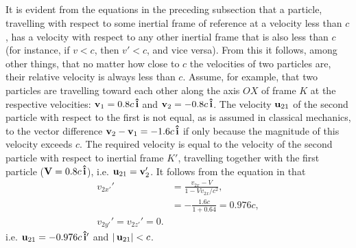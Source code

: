 \subsection{}\label{5.5.3} It is evident from the equations in the preceding subsection that a particle, travelling with respect to some inertial frame of reference at a velocity less than $c$, has a velocity with respect to any other inertial frame that is also less than $c$ (for instance, if $v < c$, then $v' < c$, and vice versa). From this it follows, among other things, that no matter how close to $c$ the velocities of two particles are, their relative velocity is always less than $c$. Assume, for example, that two particles are travelling toward each other along the axis $OX$ of frame $K$ at the respective velocities: $\vb{v}_{1}= 0.8c\,\vu{i}$ and $\vb{v}_{2}= -0.8c\,\vu{i}$. The velocity $\vb{u}_{21}$ of the second particle with respect to the first is not equal, as is assumed in classical mechanics, to the vector difference $\vb{v}_{2} - \vb{v}_{1} = -1.6c\,\vu{i}$ if only because the magnitude of this velocity exceeds $c$. The required velocity is equal to the velocity of the second particle with respect to inertial frame $K'$, travelling together with the first particle ($\vb{V}=0.8c\,\vu{i}$), i.e. $\vb{u}_{21}= \vb{v}_{2}'$. It follows from the equation in  that
\begin{align*}%
v_{2x'}' & = \frac{v_{2x} - V}{1 - V v_{2x}/c^{2}}, \\
&= - \frac{1.6c}{1+ 0.64} = 0.976c,\\
v_{2y'}' = v_{2z'}' = 0.
\end{align*}
i.e. $\vb{u}_{21}= -0.976c\,\vu{i}'$ and $\abs{\,\vb{u}_{21}} <c$.


